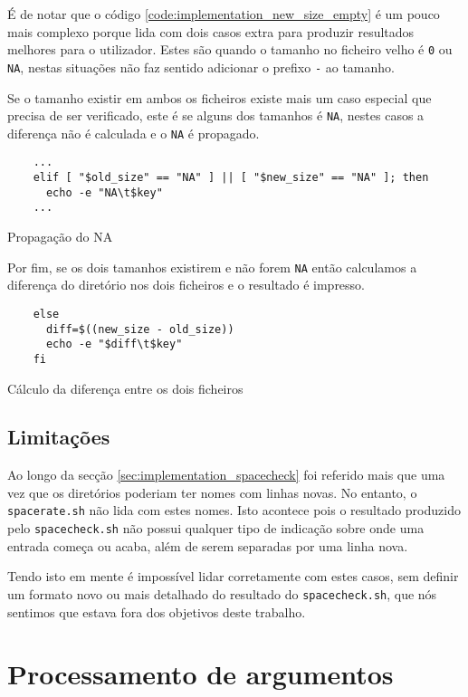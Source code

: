 É de notar que o código \ref{code:implementation_new_size_empty} é um pouco mais
complexo porque lida com dois casos extra para produzir resultados melhores para
o utilizador. Estes são quando o tamanho no ficheiro velho é \Verb|0| ou
\Verb|NA|, nestas situações não faz sentido adicionar o prefixo \Verb|-| ao
tamanho.

Se o tamanho existir em ambos os ficheiros existe mais um caso especial que
precisa de ser verificado, este é se alguns dos tamanhos é \Verb|NA|, nestes
casos a diferença não é calculada e o \Verb|NA| é propagado.

\begin{listing}[H]
	\centering
	\begin{verbatim}
    ...
    elif [ "$old_size" == "NA" ] || [ "$new_size" == "NA" ]; then
      echo -e "NA\t$key"
    ...
  \end{verbatim}
	\caption{Propagação do NA}
\end{listing}

Por fim, se os dois tamanhos existirem e não forem \Verb|NA| então calculamos a
diferença do diretório nos dois ficheiros e o resultado é impresso.

\begin{listing}[H]
	\centering
	\begin{verbatim}
    else
      diff=$((new_size - old_size))
      echo -e "$diff\t$key"
    fi
  \end{verbatim}
	\caption{Cálculo da diferença entre os dois ficheiros}
\end{listing}

\subsection{Limitações}

Ao longo da secção \ref{sec:implementation_spacecheck} foi referido mais que uma
vez que os diretórios poderiam ter nomes com linhas novas. No entanto, o
\Verb|spacerate.sh| não lida com estes nomes. Isto acontece pois o resultado
produzido pelo \Verb|spacecheck.sh| não possui qualquer tipo de indicação sobre
onde uma entrada começa ou acaba, além de serem separadas por uma linha nova.

Tendo isto em mente é impossível lidar corretamente com estes casos, sem definir
um formato novo ou mais detalhado do resultado do \Verb|spacecheck.sh|, que nós
sentimos que estava fora dos objetivos deste trabalho.

\section{Processamento de argumentos}\label{sec:implementation_arg_parsing}

